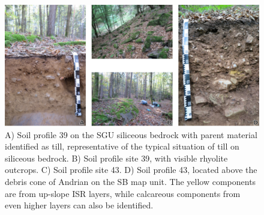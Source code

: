 \documentclass[preprint,12pt,authoryear]{elsarticle}
\begin{document}
 \begin{figure}[ht!]
\includegraphics[width=\textwidth,angle=0]{soils_110pi.pdf}
\caption{A) Soil profile 39 on the SGU siliceous bedrock with parent material identified as till, representative of the typical situation of till on siliceous bedrock. B) Soil profile site 39, with visible rhyolite outcrops.  C) Soil profile site 43. D) Soil profile 43, located above the debris cone of Andrian on the SB map unit. The yellow components are from up-slope ISR layers, while calcareous components from even higher layers can also be identified.}
\label{fig:soils}
\end{figure}
\end{document}
